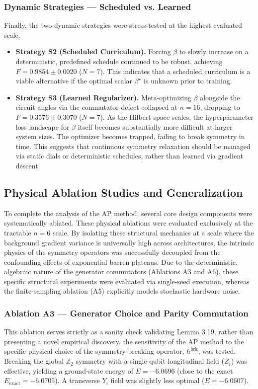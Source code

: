 \documentclass[10pt,twocolumn]{article}
\theoremstyle{remark}
\begin{document}
\subsubsection{Dynamic Strategies --- Scheduled vs. Learned}
Finally, the two dynamic strategies were stress-tested at the highest evaluated scale.
\begin{itemize}
    \item \textbf{Strategy S2 (Scheduled Curriculum).} Forcing $\beta$ to slowly increase on a deterministic, predefined schedule continued to be robust, achieving $F=0.9854 \pm 0.0020$ ($N=7$). This indicates that a scheduled curriculum is a viable alternative if the optimal scalar $\beta^\star$ is unknown prior to training.
    \item \textbf{Strategy S3 (Learned Regularizer).} Meta-optimizing $\beta$ alongside the circuit angles via the commutator-defect collapsed at $n=16$, dropping to $F=0.3576 \pm 0.3070$ ($N=7$). As the Hilbert space scales, the hyperparameter loss landscape for $\beta$ itself becomes substantially more difficult at larger system sizes. The optimizer becomes trapped, failing to break symmetry in time. This suggests that continuous symmetry relaxation should be managed via static dials or deterministic schedules, rather than learned via gradient descent.
\end{itemize}

\subsection{Physical Ablation Studies and Generalization}

To complete the analysis of the AP method, several core design components were systematically ablated. These physical ablations were evaluated exclusively at the tractable $n=6$ scale. By isolating these structural mechanics at a scale where the background gradient variance is universally high across architectures, the intrinsic physics of the symmetry operators was successfully decoupled from the confounding effects of exponential barren plateaus. Due to the deterministic, algebraic nature of the generator commutators (Ablations A3 and A6), these specific structural experiments were evaluated via single-seed execution, whereas the finite-sampling ablation (A5) explicitly models stochastic hardware noise.

\subsubsection{Ablation A3 --- Generator Choice and Parity Commutation}
This ablation serves strictly as a sanity check validating Lemma 3.19, rather than presenting a novel empirical discovery. 
the sensitivity of the AP method to the specific physical choice of the symmetry-breaking operator, $h^{\text{brk}}$, was tested. Breaking the global $\mathbb{Z}_2$ symmetry with a single-qubit longitudinal field ($Z_i$) was effective, yielding a ground-state energy of $E = -6.0696$ (close to the exact $E_{\text{exact}} = -6.0705$). A transverse $Y_i$ field was slightly less optimal ($E = -6.0607$).
\end{document}
